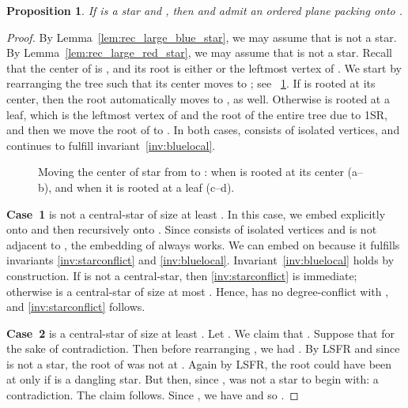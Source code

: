 \documentclass[11pt,a4paper,colorlinks=true,urlcolor=blue,citecolor=red]{article}
\theoremstyle{plain}
\newtheorem{proposition}[theorem]{Proposition}
\newcommand{\case}[1]{\par\vspace{.5\baselineskip}\noindent\textbf{\sffamily Case~#1}}
\begin{document}
\begin{proposition}\label{prop:rec_small_blue_star_larger}
  If  is a star and , then  and 
  admit an ordered plane packing onto .
\end{proposition}
\begin{proof}
  By Lemma~\ref{lem:rec_large_blue_star}, we may assume that
   is not a star. By Lemma~\ref{lem:rec_large_red_star}, we
  may assume that  is not a star. Recall that the center of
   is , and its root is either  or the leftmost vertex of
  . We start by rearranging the tree  such that its
  center moves to ; see \figurename~\ref{fig:move_center}. If
   is rooted at its center, then the root automatically moves to
  , as well. Otherwise  is rooted at a leaf, which is the
  leftmost vertex of  and the root of the entire tree
   due to 1SR, and then we move the root of  to .
  In both cases,  consists of  isolated vertices, and
   continues to fulfill invariant~\ref{inv:bluelocal}.

\begin{figure}
  \centering\hfil {}\hfil {}\hfil {}\hfil {}\hfil \caption{Moving the center of star  from  to :
  when  is rooted at its center (a--b), and when it is rooted at a leaf (c--d).
  \label{fig:move_center}
}
\end{figure}

\case{1}  is not a central-star of size at least
. In this case, we embed  explicitly onto
 and then  recursively onto . Since
 consists of isolated vertices and  is not
adjacent to , the embedding of  always works. We can embed 
on  because it fulfills invariants \ref{inv:starconflict} and
\ref{inv:bluelocal}. Invariant~\ref{inv:bluelocal} holds by
construction. If  is not a central-star, then
\ref{inv:starconflict} is immediate; otherwise 
is a central-star of size at most . Hence,  has
no degree-conflict with , and \ref{inv:starconflict} follows.

\case{2}  is a central-star of size at least
. Let . We claim
that . Suppose that 
for the sake of contradiction. Then before rearranging , we had
. By LSFR and since  is not a star, the root of 
was not at . Again by LSFR, the root could have been at  only if
 is a dangling star. But then, since ,
 was not a star to begin with: a contradiction. The claim
follows. Since , we have
 and so .


\end{proof}
\end{document}
